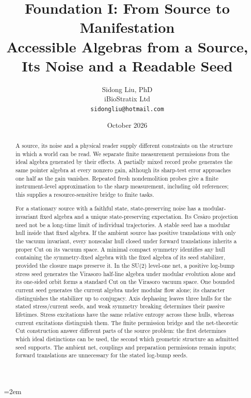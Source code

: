 \documentclass[12pt]{article}
\title{%
  \textbf{Foundation I: From Source to Manifestation}\\[0.4ex]
  \large\textbf{Accessible Algebras from a Source,}\\
  \large\textbf{Its Noise and a Readable Seed}%
}
\author{
  Sidong Liu, PhD \\
  \small iBioStratix Ltd \\
  \small \texttt{sidongliu@hotmail.com}
}
\date{October 2026}
\theoremstyle{definition}
\theoremstyle{remark}
\begin{document}
\emergencystretch=2em
\raggedbottom
{}

\maketitle

\begin{abstract}
A source, its noise and a physical reader supply different constraints on the
structure in which a world can be read. We separate finite measurement permissions
from the ideal algebra generated by their effects. A partially mixed record probe
generates the same pointer algebra at every nonzero gain, although its sharp-test
error approaches one half as the gain vanishes. Repeated fresh nondemolition probes
give a finite instrument-level approximation to the sharp measurement, including
old references; this supplies a resource-sensitive bridge to finite tasks.

For a stationary source with a faithful state, state-preserving noise has a
modular-invariant fixed algebra and a unique state-preserving expectation. Its
Ces\`aro projection need not be a long-time limit of individual trajectories.
A stable seed has a modular hull inside that fixed algebra. If the ambient source
has positive translations with only the vacuum invariant, every nonscalar hull
closed under forward translations inherits a proper Cut on its vacuum space.
A minimal compact symmetry identifies any hull containing the symmetry-fixed
algebra with the fixed algebra of its seed stabilizer, provided the closure maps
preserve it. In the SU(2) level-one net, a positive log-bump stress seed
generates the Virasoro half-line algebra under modular evolution alone and
its one-sided orbit forms a standard Cut on the Virasoro vacuum space.
One bounded current seed generates the
current algebra under modular flow alone; its character distinguishes the
stabilizer up to conjugacy. Axis dephasing leaves three hulls for the stated
stress/current seeds, and weak symmetry breaking determines their passive
lifetimes. Stress excitations have the same relative entropy across these hulls,
whereas current excitations distinguish them. The finite permission bridge and the net-theoretic Cut construction answer
different parts of the source problem: the first determines which ideal
distinctions can be used, the second which geometric structure an admitted
seed supports. The ambient net, couplings and preparation permissions remain
inputs; forward translations are unnecessary for the stated log-bump seeds.
\end{abstract}
\end{document}
